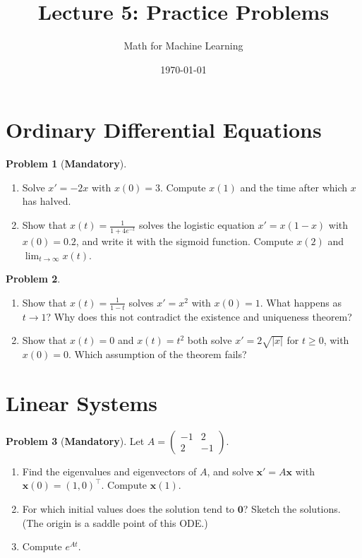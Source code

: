 \documentclass[11pt]{article}
\title{Lecture 5: Practice Problems}
\author{Math for Machine Learning}
\date{\today}
\theoremstyle{definition}
\newtheorem{problem}{Problem}[section]
\newcommand{\mandatory}{\textcolor{red!70!black}{\textbf{Mandatory}}}
\begin{document}
\maketitle

\section{Ordinary Differential Equations}

\begin{problem}[\mandatory]\label{pr:scalar-ode}
    \begin{enumerate}[label=(\alph*)]
        \item Solve $x' = -2x$ with $x(0) = 3$. Compute $x(1)$ and the time after which $x$ has halved.
        \item Show that $x(t) = \frac{1}{1 + 4e^{-t}}$ solves the logistic equation $x' = x(1 - x)$ with $x(0) = 0.2$, and write it with the sigmoid function. Compute $x(2)$ and $\lim_{t \to \infty} x(t)$.
    \end{enumerate}
\end{problem}

\begin{problem}\label{pr:existence}
    \begin{enumerate}[label=(\alph*)]
        \item Show that $x(t) = \frac{1}{1 - t}$ solves $x' = x^2$ with $x(0) = 1$. What happens as $t \to 1$? Why does this not contradict the existence and uniqueness theorem?
        \item Show that $x(t) = 0$ and $x(t) = t^2$ both solve $x' = 2\sqrt{|x|}$ for $t \geq 0$, with $x(0) = 0$. Which assumption of the theorem fails?
    \end{enumerate}
\end{problem}

\section{Linear Systems}

\begin{problem}[\mandatory]\label{pr:linear-system}
    Let $A = \begin{pmatrix} -1 & 2 \\ 2 & -1 \end{pmatrix}$.
    \begin{enumerate}[label=(\alph*)]
        \item Find the eigenvalues and eigenvectors of $A$, and solve $\mathbf{x}' = A\mathbf{x}$ with $\mathbf{x}(0) = (1, 0)^\top$. Compute $\mathbf{x}(1)$.
        \item For which initial values does the solution tend to $\mathbf{0}$? Sketch the solutions. (The origin is a saddle point of this ODE.)
        \item Compute $e^{At}$.
    \end{enumerate}
\end{problem}
\end{document}
